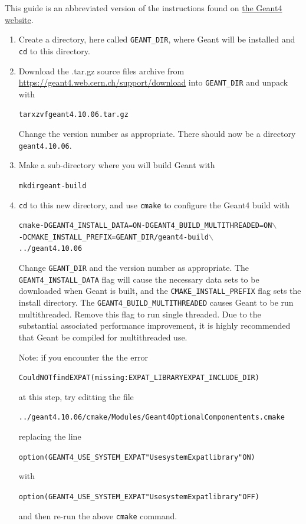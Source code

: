 \documentclass[12pt]{article}
\newcommand{\B}{$\backslash$}
\newenvironment{example}
  {\vspace{-2.5ex} \begin{alltt}}
  {\end{alltt} \vspace{-2.2ex}}
\begin{document}
This guide is an abbreviated version of the instructions found on
\href{http://geant4-userdoc.web.cern.ch/geant4-userdoc/UsersGuides/InstallationGuide/html/}{the
Geant4 website}.
\begin{enumerate}
\item
Create a directory, here called \texttt{GEANT\_DIR}, where Geant will be installed and \texttt{cd}
to this directory.

\item
Download the .tar.gz source files archive from \url{https://geant4.web.cern.ch/support/download}
into \texttt{GEANT\_DIR} and unpack with
\begin{example}
  tar xzvf geant4.10.06.tar.gz
\end{example}
Change the version number as appropriate. There should now be a directory \texttt{geant4.10.06}.

\item
Make a sub-directory where you will build Geant with
\begin{example}
  mkdir geant-build
\end{example}

\item
\texttt{cd} to this new directory, and use \texttt{cmake} to configure the Geant4 build with
\begin{example}
  cmake -DGEANT4_INSTALL_DATA=ON -DGEANT4_BUILD_MULTITHREADED=ON \B
        -DCMAKE_INSTALL_PREFIX=GEANT_DIR/geant4-build \B
        ../geant4.10.06
\end{example}
Change \texttt{GEANT_DIR} and the version number as appropriate. The \texttt{GEANT4_INSTALL_DATA}
flag will cause the necessary data sets to be downloaded when Geant is built, and the
\texttt{CMAKE_INSTALL_PREFIX} flag sets the install directory. The
\texttt{GEANT4_BUILD_MULTITHREADED} causes Geant to be run multithreaded. Remove this flag to run
single threaded. Due to the substantial associated performance improvement, it is highly recommended
that Geant be compiled for multithreaded use.

Note: if you encounter the the error
\begin{example}
  Could NOT find EXPAT (missing: EXPAT_LIBRARY EXPAT_INCLUDE_DIR)
\end{example}
at this step, try editting the file
\begin{example}
  ../geant4.10.06/cmake/Modules/Geant4OptionalComponentents.cmake
\end{example}
replacing the line
\begin{example}
  option(GEANT4_USE_SYSTEM_EXPAT "Use system Expat library" ON)
\end{example}
with
\begin{example}
  option(GEANT4_USE_SYSTEM_EXPAT "Use system Expat library" OFF)
\end{example}
and then re-run the above \texttt{cmake} command.


\end{enumerate}
\end{document}
